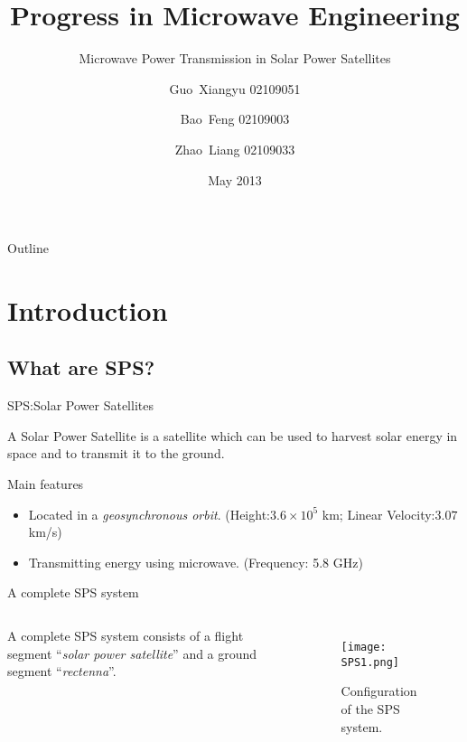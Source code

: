 \documentclass{beamer}
\title[Solar Power Satellites]{
  Progress in Microwave Engineering
}
\subtitle{
  Microwave Power Transmission in Solar Power Satellites
}
\author[xdgxygpl@gmail.com]{
  Guo~Xiangyu 02109051\and
  Bao~Feng 02109003\and
  Zhao~Liang 02109033
}
\institute[SEE at XDU]{
  School of Electronic Engineering\\
  Xidian University
}
\date[2013]{
  May 2013
}
\begin{document}
\begin{frame}
  \titlepage
\end{frame}

\begin{frame}[label=outl]{Outline}
  \tableofcontents
\end{frame}

\section{Introduction}

\subsection{What are SPS?}

\begin{frame}[label=what1]{SPS:Solar Power Satellites}
  \begin{definition}
    A \alert{Solar Power Satellite} is \pause
    a satellite which can be used to harvest solar energy in space
    and to transmit it to the ground.
  \end{definition}
  \pause
  \begin{block}{Main features}
    \begin{itemize}
    \item Located in a \emph{geosynchronous orbit}.
      (Height:$3.6\times 10^5$ km; Linear Velocity:$3.07$ km/s)
    \item Transmitting energy using microwave.
      (Frequency: 5.8 GHz)
    \end{itemize}
  \end{block}
\end{frame}

\begin{frame}[label=what2]{A complete SPS system}
  \begin{columns}
    {\small A complete SPS system consists of a flight segment
      ``\emph{solar power satellite}'' and a ground segment
      ``\emph{rectenna}''.\cite{MPTtech4SPS}}
    \begin{figure}[H]
      \centering
      \texttt{[image: SPS1.png]}
      \caption{Configuration of the SPS system.\cite{MPTtech4SPS}}
    \end{figure}
  \end{columns}
\end{frame}
\end{document}
